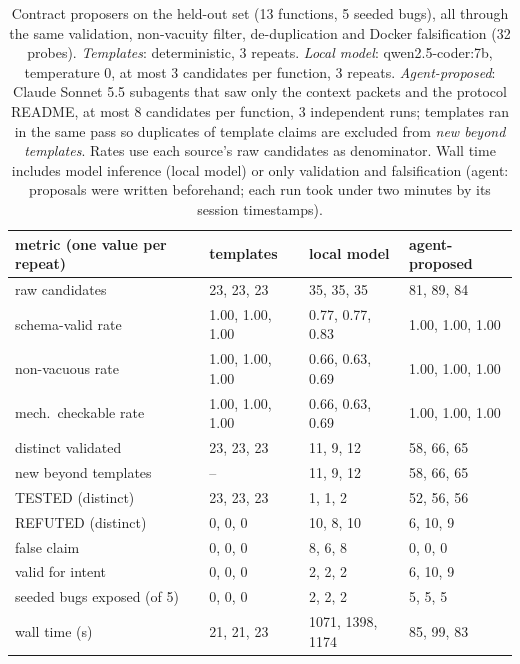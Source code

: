 \begin{table}[t]
\centering
\small

\caption{Contract proposers on the held-out set (13 functions, 5 seeded bugs), all through the same validation, non-vacuity filter, de-duplication and Docker falsification (32 probes). \emph{Templates}: deterministic, 3 repeats. \emph{Local model}: qwen2.5-coder:7b, temperature 0, at most 3 candidates per function, 3 repeats. \emph{Agent-proposed}: Claude Sonnet 5.5 subagents that saw only the context packets and the protocol README, at most 8 candidates per function, 3 independent runs; templates ran in the same pass so duplicates of template claims are excluded from \emph{new beyond templates}. Rates use each source's raw candidates as denominator. Wall time includes model inference (local model) or only validation and falsification (agent: proposals were written beforehand; each run took under two minutes by its session timestamps).}
\label{tab:model}
\begin{tabular}{llll}
\toprule
metric (one value per repeat) & templates & local model & agent-proposed \\
\midrule
raw candidates & 23, 23, 23 & 35, 35, 35 & 81, 89, 84 \\
schema-valid rate & 1.00, 1.00, 1.00 & 0.77, 0.77, 0.83 & 1.00, 1.00, 1.00 \\
non-vacuous rate & 1.00, 1.00, 1.00 & 0.66, 0.63, 0.69 & 1.00, 1.00, 1.00 \\
mech.\ checkable rate & 1.00, 1.00, 1.00 & 0.66, 0.63, 0.69 & 1.00, 1.00, 1.00 \\
distinct validated & 23, 23, 23 & 11, 9, 12 & 58, 66, 65 \\
\quad new beyond templates & -- & 11, 9, 12 & 58, 66, 65 \\
TESTED (distinct) & 23, 23, 23 & 1, 1, 2 & 52, 56, 56 \\
REFUTED (distinct) & 0, 0, 0 & 10, 8, 10 & 6, 10, 9 \\
\quad false claim & 0, 0, 0 & 8, 6, 8 & 0, 0, 0 \\
\quad valid for intent & 0, 0, 0 & 2, 2, 2 & 6, 10, 9 \\
seeded bugs exposed (of 5) & 0, 0, 0 & 2, 2, 2 & 5, 5, 5 \\
wall time (s) & 21, 21, 23 & 1071, 1398, 1174 & 85, 99, 83 \\
\bottomrule
\end{tabular}
\end{table}
